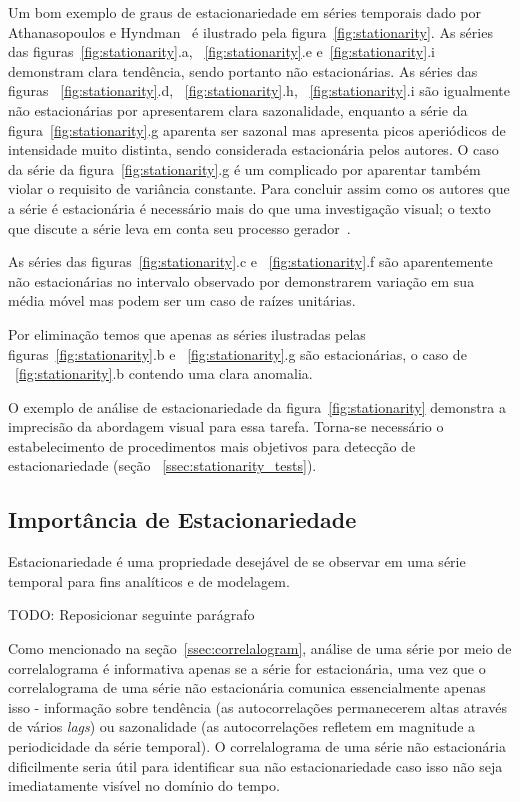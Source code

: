 Um bom exemplo de graus de estacionariedade em séries temporais dado por
Athanasopoulos e Hyndman~\cite{athana} é ilustrado pela
figura~\ref{fig:stationarity}. As séries das figuras~\ref{fig:stationarity}.a,
~\ref{fig:stationarity}.e e~\ref{fig:stationarity}.i demonstram clara
tendência, sendo portanto não estacionárias. As séries das figuras
~\ref{fig:stationarity}.d, ~\ref{fig:stationarity}.h, ~\ref{fig:stationarity}.i
são igualmente não estacionárias por apresentarem clara sazonalidade, enquanto
a série da figura~\ref{fig:stationarity}.g aparenta ser sazonal mas apresenta
picos aperiódicos de intensidade muito distinta, sendo considerada estacionária
pelos autores. O caso da série da figura~\ref{fig:stationarity}.g é um
complicado por aparentar também violar o requisito de variância constante. Para
concluir assim como os autores que a série é estacionária é necessário mais do
que uma investigação visual; o texto que discute a série leva em conta seu
processo gerador~\cite{athana}.

As séries das figuras~\ref{fig:stationarity}.c e ~\ref{fig:stationarity}.f são
aparentemente não estacionárias no intervalo observado por demonstrarem
variação em sua média móvel mas podem ser um caso de raízes unitárias.

Por eliminação temos que apenas as séries ilustradas pelas
figuras~\ref{fig:stationarity}.b e ~\ref{fig:stationarity}.g são estacionárias,
o caso de ~\ref{fig:stationarity}.b contendo uma clara anomalia.

O exemplo de análise de estacionariedade da figura~\ref{fig:stationarity}
demonstra a imprecisão da abordagem visual para essa tarefa. Torna-se
necessário o estabelecimento de procedimentos mais objetivos para detecção de
estacionariedade (seção ~\ref{ssec:stationarity_tests}).

\subsection{Importância de Estacionariedade}

Estacionariedade é uma propriedade desejável de se observar em uma série
temporal para fins analíticos e de modelagem.

TODO: Reposicionar seguinte parágrafo

Como mencionado na seção~\ref{ssec:correlalogram}, análise de uma série por
meio de correlalograma é informativa apenas se a série for estacionária, uma
vez que o correlalograma de uma série não estacionária comunica essencialmente
apenas isso - informação sobre tendência (as autocorrelações permanecerem
altas através de vários \emph{lags}) ou sazonalidade (as autocorrelações
refletem em magnitude a periodicidade da série temporal). O correlalograma de
uma série não estacionária dificilmente seria útil para identificar sua não
estacionariedade caso isso não seja imediatamente visível no domínio do tempo.

